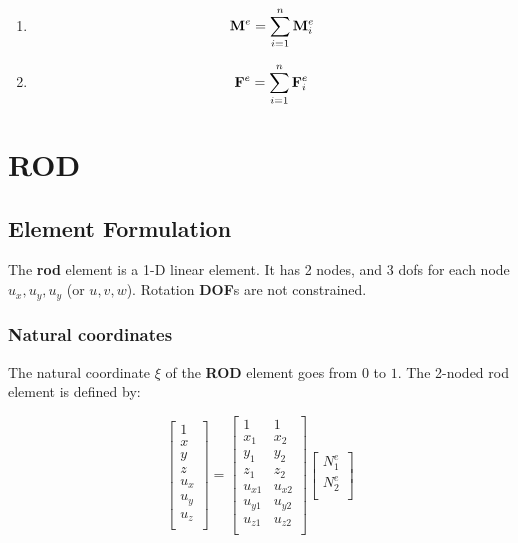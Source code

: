 \begin{enumerate}
\begin{enumerate}
            \item \begin{equation}
                    \mathbf{M}^e = \sum_{i=1}^n \mathbf{M}_i^e
                \end{equation}

            \item \begin{equation}
                    \mathbf{F}^e = \sum_{i=1}^n \mathbf{F}_i^e
                \end{equation}
        \end{enumerate}
\end{enumerate}


\newpage
\section{ROD}

\subsection{Element Formulation}
The \textbf{rod} element is a 1-D linear element. It has 2 nodes, and 3 dofs for
each node $ u_x, u_y, u_y $ (or $ u, v, w $). Rotation \textbf{DOF}s are not
constrained.

\subsubsection{Natural coordinates}
The natural coordinate $ \xi $ of the \textbf{ROD} element goes from $ 0 $ to $ 1 $.
The 2-noded rod element is defined by:

\begin{equation}
    \begin{bmatrix}
        1 \\
        x \\
        y \\
        z \\
        u_x \\
        u_y \\
        u_z \\
    \end{bmatrix}
    = \begin{bmatrix}
        1 & 1 \\
        x_1 & x_2 \\
        y_1 & y_2 \\
        z_1 & z_2 \\
        u_{x1} & u_{x2} \\
        u_{y1} & u_{y2} \\
        u_{z1} & u_{z2} \\
    \end{bmatrix}
    \begin{bmatrix}
        N_1^e \\
        N_2^e \\
    \end{bmatrix}
\end{equation}

